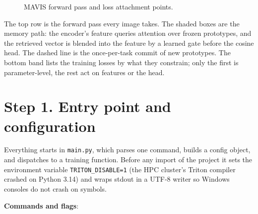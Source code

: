 \documentclass[11pt,a4paper]{article}
\newcommand{\code}[1]{\texttt{#1}}
\begin{document}
\begin{figure}[h]
\caption{MAVIS forward pass and loss attachment points.}
\end{figure}

The top row is the forward pass every image takes. The shaded boxes are the memory path: the encoder's feature queries attention over frozen prototypes, and the retrieved vector is blended into the feature by a learned gate before the cosine head. The dashed line is the once-per-task commit of new prototypes. The bottom band lists the training losses by what they constrain; only the first is parameter-level, the rest act on features or the head.

\section{Step 1. Entry point and configuration}

Everything starts in \code{main.py}, which parses one command, builds a config object, and dispatches to a training function. Before any import of the project it sets the environment variable \code{TRITON\_DISABLE=1} (the HPC cluster's Triton compiler crashed on Python 3.14) and wraps stdout in a UTF-8 writer so Windows consoles do not crash on symbols.

\textbf{Commands and flags}:
\end{document}
